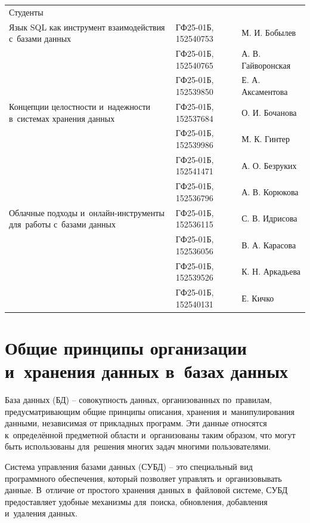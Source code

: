 \documentclass{ou}
\begin{document}
\begin{flushleft}
\doublespacing
\begin{tabularx}{\textwidth}{@{} p{} l l @{}}
Студенты     &                     &         \\
\multirow{-2.27}{\hsize}{\singlespacing Язык SQL как инструмент взаимодействия с~базами данных}
             & ГФ25-01Б, 152540753 & М. И. Бобылев\\
             & ГФ25-01Б, 152540765 & А. В. Гайворонская\\
             & ГФ25-01Б, 152539850 & Е. А. Аксаментова\\
\multirow{-2.27}{\hsize}{\singlespacing Концепции целостности и~надежности в~системах хранения данных}
             & ГФ25-01Б, 152537684 & О. И. Бочанова\\
             & ГФ25-01Б, 152539986 & М. К. Гинтер\\
             & ГФ25-01Б, 152541471 & А. О. Безруких\\
             & ГФ25-01Б, 152536796 & А. В. Корюкова\\
\multirow{-2.27}{\hsize}{\singlespacing Облачные подходы и~онлайн-инструменты для~работы с~базами данных}
             & ГФ25-01Б, 152536115 & С. В. Идрисова\\
             & ГФ25-01Б, 152536056 & В. А. Карасова\\
             & ГФ25-01Б, 152539526 & К. Н. Аркадьева\\
             & ГФ25-01Б, 152540131 & Е. Кичко\\
\end{tabularx}
\end{flushleft}
\newpage
\tableofcontents
\newpage
\onehalfspacing
\section{Общие принципы организации и~хранения данных в~базах данных}
База данных (БД) -- совокупность данных, организованных по~правилам, предусматривающим общие принципы описания, хранения и~манипулирования данными, независимая от прикладных программ. Эти данные относятся к~определённой предметной области и~организованы таким образом, что могут быть использованы для~решения многих задач многими пользователями\cite{Karpova2013}. 

Система управления базами данных (СУБД) -- это специальный вид программного обеспечения, который позволяет управлять и~организовывать данные. В~отличие от простого хранения данных в~файловой системе, СУБД предоставляет удобные механизмы для~поиска, обновления, добавления и~удаления данных. 
\end{document}
